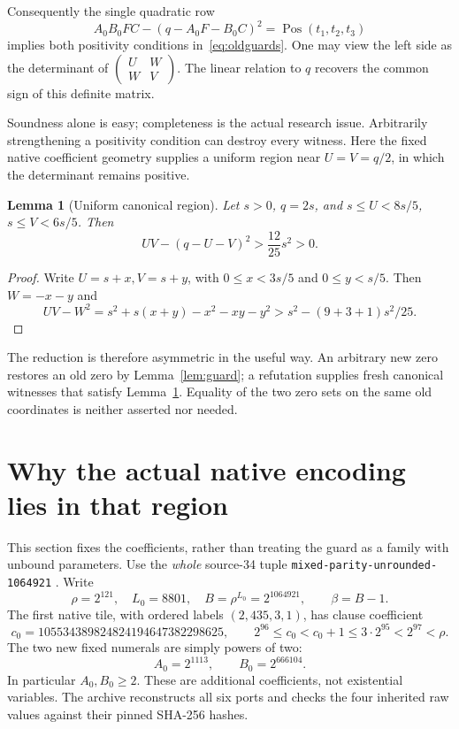 \documentclass[11pt]{article}
\newtheorem{lemma}[theorem]{Lemma}
\theoremstyle{definition}\newtheorem{definition}[theorem]{Definition}
\theoremstyle{remark}\newtheorem{remark}[theorem]{Remark}
\newcommand{\Pos}{\operatorname{Pos}}
\begin{document}
Consequently the single quadratic row
\begin{equation}\label{eq:newguard}
 \boxed{A_0B_0FC-(q-A_0F-B_0C)^2=\Pos(t_1,t_2,t_3)}
\end{equation}
implies both positivity conditions in~\eqref{eq:oldguards}. One may view
the left side as the determinant of
$\left(\begin{smallmatrix}U&W\\W&V\end{smallmatrix}\right)$.
The linear relation to $q$ recovers the common sign of this definite matrix.

Soundness alone is easy; completeness is the actual research issue.
Arbitrarily strengthening a positivity condition can destroy every witness.
Here the fixed native coefficient geometry supplies a uniform region
near $U=V=q/2$, in which the determinant remains positive.

\begin{lemma}[Uniform canonical region]\label{lem:region}
Let $s>0$, $q=2s$, and
$s\le U<8s/5$, $s\le V<6s/5$. Then
\[
 UV-(q-U-V)^2>\frac{12}{25}s^2>0.
\]
\end{lemma}
\begin{proof}
Write $U=s+x,V=s+y$, with $0\le x<3s/5$ and $0\le y<s/5$.
Then $W=-x-y$ and
\[
 UV-W^2=s^2+s(x+y)-x^2-xy-y^2
               >s^2-(9+3+1)s^2/25.
\]
\end{proof}

The reduction is therefore asymmetric in the useful way. An arbitrary
new zero restores an old zero by Lemma~\ref{lem:guard}; a refutation supplies
fresh canonical witnesses that satisfy Lemma~\ref{lem:region}. Equality of
the two zero sets on the same old coordinates is neither asserted nor
needed.

\section{Why the actual native encoding lies in that region}
\label{sec:canonical}

This section fixes the coefficients, rather than treating the guard as a
family with unbound parameters. Use the \emph{whole} source-34 tuple
\texttt{mixed-parity-unrounded-1064921} \cite{p34}. Write
\[
 \rho=2^{121},\quad L_0=8801,\quad B=\rho^{L_0}=2^{1064921},
 \qquad\beta=B-1.
\]
The first native tile, with ordered labels $(2,435,3,1)$, has clause
coefficient
\begin{equation}\label{eq:c0}
 c_0=105534389824824194647382298625,
 \qquad 2^{96}\le c_0<c_0+1\le3\cdot2^{95}<2^{97}<\rho.
\end{equation}
The two new fixed numerals are simply powers of two:
\begin{equation}\label{eq:scales}
 \boxed{A_0=2^{1113},\qquad B_0=2^{666104}.}
\end{equation}
In particular $A_0,B_0\ge2$. These are additional coefficients,
not existential variables. The archive reconstructs all six ports and
checks the four inherited raw values against their pinned SHA-256 hashes.
\end{document}
